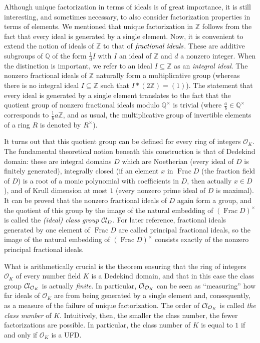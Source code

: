\documentclass[sn-mathphys]{sn-jnl}%
\newcommand*{\OK}[1][K]{\mathcal{O}_{#1}}
\newcommand*{\Cl}{\mathcal{C}\kern-.075em l}
\newcommand{\QQ}{\mathbb{Q}}
\renewcommand{\Z}{\mathbb{Z}}
\DeclareMathOperator{\Frac}{Frac}
\begin{document}
Although unique factorization in terms of ideals is of great importance, it is still interesting, and sometimes
necessary, to also consider factorization properties in terms of elements.
We mentioned that unique factorization in $\Z$ follows from the fact that every ideal is generated by a single element.
Now, it is convenient to extend the notion of ideals of $\Z$ to that of $\emph{fractional ideals}$. 
These are additive subgroups of $\QQ$ of the form $\frac{1}{d} I$ with $I$ an ideal of $\Z$ and $d$ a nonzero integer.
When the distinction is important, we refer to an ideal $I \subseteq \Z$ as an \emph{integral ideal}.
The nonzero fractional ideals of $\Z$ naturally form a multiplicative group (whereas there is no integral ideal $I\subseteq \Z$ such that $I*(2\Z)=(1)$).
The statement that every ideal is generated by a single element
translates to the fact that the quotient group of nonzero fractional ideals modulo $\QQ^\times$ is trivial (where $\frac{a}{b} \in \QQ^\times$ corresponds to $\frac{1}{b} a \Z$, and as usual, the multiplicative group of invertible elements of a ring $R$ is denoted by $R^{\times}$).

It turns out that this quotient group can be defined for every ring of integers $\OK$.
The fundamental theoretical notion beneath this construction is that of Dedekind domain: these are integral domains $D$ which are Noetherian (every ideal of $D$ is finitely generated), integrally closed (if an element $x$ in $\Frac D$ (the fraction field of $D$) is a root of a monic polynomial with coefficients in $D$, then actually $x \in D$), and of Krull dimension at most $1$ (every nonzero prime ideal of $D$ is maximal).
It can be proved that the nonzero fractional ideals of $D$
again form a group, and the quotient of this group by the image of the natural embedding of $(\Frac D)^\times$ is called the \emph{\textup{(}ideal\textup{)} class group} $\Cl_{D}$.
For later reference, fractional ideals generated by one element of $\Frac D$ are called principal fractional ideals, so the image of the natural embedding of $(\Frac D)^\times$ consists exactly of the nonzero principal fractional ideals.

What is arithmetically crucial is the theorem ensuring that the ring of integers $\OK$ of every number field $K$ is a Dedekind domain,
and that in this case the class group $\Cl_{\OK}$ is actually \emph{finite}.
In particular, $\Cl_{\OK}$ can be seen as ``measuring'' how far ideals of $\OK$ are from being generated by a single element and,
consequently, as a measure of the failure of unique factorization.
The order of $\Cl_{\OK}$ is called \emph{the class number} of $K$.
Intuitively, then, the smaller the class number, the fewer factorizations are possible.
In particular, the class number of $K$ is equal to $1$ if and only if $\OK$ is a UFD.
\end{document}
